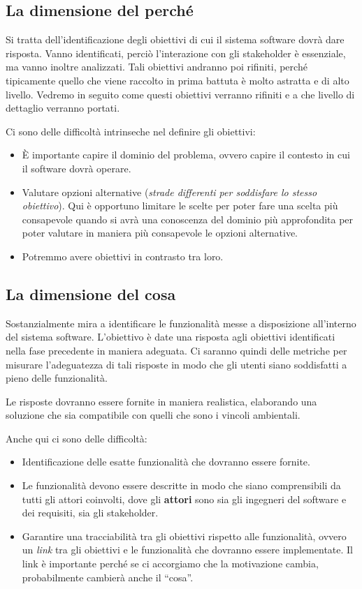 \subsection{La dimensione del perché}
Si tratta dell'identificazione degli obiettivi di cui il 
sistema software dovrà dare risposta. Vanno identificati, perciò 
l'interazione con gli stakeholder è essenziale, ma vanno inoltre 
analizzati. Tali obiettivi andranno poi rifiniti, perché tipicamente 
quello che viene raccolto in prima battuta è molto astratta e 
di alto livello. Vedremo in seguito come questi obiettivi verranno 
rifiniti e a che livello di dettaglio verranno portati.

Ci sono delle difficoltà intrinseche nel definire gli obiettivi:
\begin{itemize}
    \item È importante capire il dominio del problema, ovvero
    capire il contesto in cui il software dovrà operare.
    \item Valutare opzioni alternative (\textit{strade differenti 
    per soddisfare lo stesso obiettivo}). Qui è opportuno limitare 
    le scelte per poter fare una scelta più consapevole quando 
    si avrà una conoscenza del dominio più approfondita per poter valutare 
    in maniera più consapevole le opzioni alternative.
    \item Potremmo avere obiettivi in contrasto tra loro.
\end{itemize}
\subsection{La dimensione del cosa}
Sostanzialmente mira a identificare le funzionalità messe a disposizione 
all'interno del sistema software. L'obiettivo è date una risposta agli 
obiettivi identificati nella fase precedente in maniera adeguata. Ci saranno quindi 
delle metriche per misurare l'adeguatezza di tali risposte 
in modo che gli utenti siano soddisfatti a pieno delle funzionalità.

Le risposte dovranno essere fornite in maniera realistica, elaborando una soluzione 
che sia compatibile con quelli che sono i vincoli ambientali.

Anche qui ci sono delle difficoltà:
\begin{itemize}
    \item Identificazione delle esatte funzionalità che 
    dovranno essere fornite.
    \item Le funzionalità devono essere descritte in modo che siano comprensibili 
    da tutti gli attori coinvolti, dove gli \textbf{attori} sono sia 
    gli ingegneri del software e dei requisiti, sia gli stakeholder.
    \item Garantire una tracciabilità tra gli obiettivi rispetto 
    alle funzionalità, ovvero un \textit{link} tra gli obiettivi
    e le funzionalità che dovranno essere implementate. Il link è 
    importante perché se ci accorgiamo che la motivazione cambia, 
    probabilmente cambierà anche il ``cosa''.
\end{itemize}
